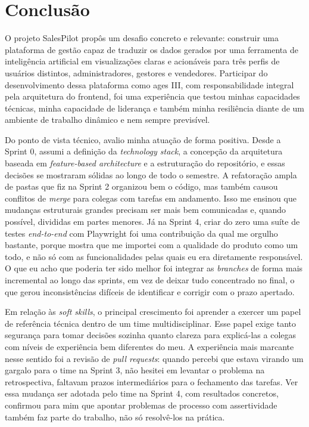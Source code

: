 \section[Conclusão]{Conclusão}

O projeto SalesPilot propôs um desafio concreto e relevante: construir uma plataforma de gestão capaz de traduzir os dados gerados por uma ferramenta de inteligência artificial em visualizações claras e acionáveis para três perfis de usuários distintos, administradores, gestores e vendedores. Participar do desenvolvimento dessa plataforma como \ac{ages} III, com responsabilidade integral pela arquitetura do frontend, foi uma experiência que testou minhas capacidades técnicas, minha capacidade de liderança e também minha resiliência diante de um ambiente de trabalho dinâmico e nem sempre previsível.

Do ponto de vista técnico, avalio minha atuação de forma positiva. Desde a Sprint 0, assumi a definição da \textit{technology stack}, a concepção da arquitetura baseada em \textit{feature-based architecture} e a estruturação do repositório, e essas decisões se mostraram sólidas ao longo de todo o semestre. A refatoração ampla de pastas que fiz na Sprint 2 organizou bem o código, mas também causou conflitos de \textit{merge} para colegas com tarefas em andamento. Isso me ensinou que mudanças estruturais grandes precisam ser mais bem comunicadas e, quando possível, divididas em partes menores. Já na Sprint 4, criar do zero uma suíte de testes \textit{end-to-end} com Playwright foi uma contribuição da qual me orgulho bastante, porque mostra que me importei com a qualidade do produto como um todo, e não só com as funcionalidades pelas quais eu era diretamente responsável. O que eu acho que poderia ter sido melhor foi integrar as \textit{branches} de forma mais incremental ao longo das sprints, em vez de deixar tudo concentrado no final, o que gerou inconsistências difíceis de identificar e corrigir com o prazo apertado.

Em relação às \textit{soft skills}, o principal crescimento foi aprender a exercer um papel de referência técnica dentro de um time multidisciplinar. Esse papel exige tanto segurança para tomar decisões sozinha quanto clareza para explicá-las a colegas com níveis de experiência bem diferentes do meu. A experiência mais marcante nesse sentido foi a revisão de \textit{pull requests}: quando percebi que estava virando um gargalo para o time na Sprint 3, não hesitei em levantar o problema na retrospectiva, faltavam prazos intermediários para o fechamento das tarefas. Ver essa mudança ser adotada pelo time na Sprint 4, com resultados concretos, confirmou para mim que apontar problemas de processo com assertividade também faz parte do trabalho, não só resolvê-los na prática.

